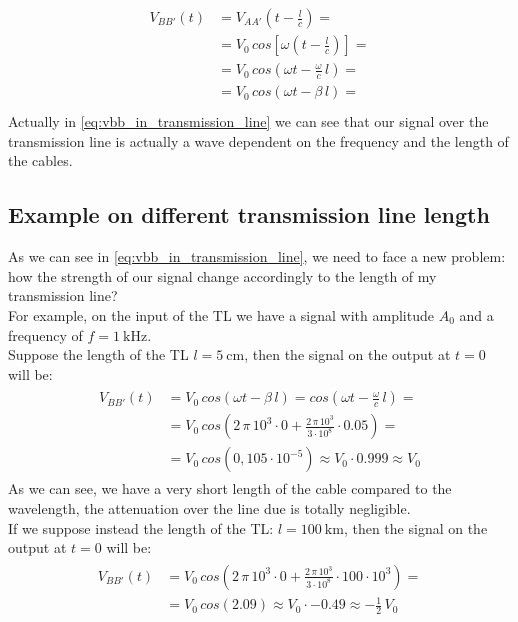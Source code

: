 \begin{align}\label{eq:vbb_in_transmission_line}
  \begin{split}
    V_{BB'}(t)&=V_{AA'}\left(t-\frac{l}{c}\right)=\\[5pt]
      &=V_0 \, cos\left[\omega \left(t-\frac{l}{c}\right)\right]=\\[5pt]
      &=V_0\, cos\left(\omega t-\frac{\omega}{c}\, l\right)=\\[5pt]
      &=V_0\, cos\left(\omega t-\beta\, l\right)= \\[5pt]
  \end{split}
\end{align}
Actually in \cref{eq:vbb_in_transmission_line} we can see that our signal over the transmission line is actually a wave dependent on the frequency and the length of the cables.
\subsection*{Example on different transmission line length}
As we can see in \cref{eq:vbb_in_transmission_line}, we need to face a new problem: how the strength of our signal change accordingly to the length of my transmission line?\\
For example, on the input of the TL we have a signal with amplitude $A_0$ and a frequency of $f=\SI{1}{\kilo\hertz}$.\\
Suppose the length of the TL $l=\SI{5}{\centi \meter}$, then the signal on the output at $t=0$ will be:
\begin{align*}
  \begin{split}
  V_{BB'}(t)&=V_0\, cos\left(\omega t-\beta\, l\right)=cos\left(\omega t-\frac{\omega}{c}\, l\right)=\\[5pt]
  &=V_0\, cos\left(2\,\pi\,10^{3}\cdot 0+\frac{2\,\pi\,10^{3}}{3\cdot 10^{8}}\cdot 0.05\right)=\\[5pt]
  &=V_0\,cos(0,105 \cdot 10^{-5})\approx V_0\cdot 0.999\approx V_0
  \end{split}
\end{align*}
As we can see, we have a very short length of the cable compared to the wavelength, the attenuation over the line due is totally negligible.\\
If we suppose instead the length of the TL: $l=\SI{100}{\kilo \meter}$, then the signal on the output at $t=0$ will be:
\begin{align*}
  \begin{split}
  V_{BB'}(t)&=V_0\, cos\left(2\,\pi\,10^{3}\cdot 0+\frac{2\,\pi\,10^{3}}{3\cdot 10^{8}}\cdot100\cdot 10^{3}\right)=\\[5pt]
  &=V_0\,cos(2.09)\approx V_0\cdot -0.49\approx -\frac{1}{2}\,V_0
  \end{split}
\end{align*}
